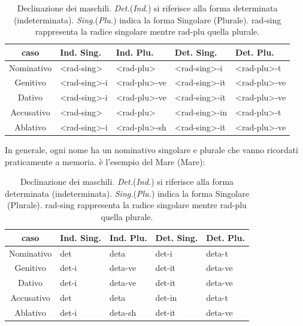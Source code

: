 \begin{table}[H]
    \centering
    \begin{tabular}{cllll}
        \toprule
        caso        & Ind. Sing.         & Ind. Plu.        & Det. Sing.      & Det. Plu. \\
        \midrule
        Nominativo  & <rad-sing>         & <rad-plu>        & <rad-sing>-i    & <rad-plu>-t  \\
        Genitivo    & <rad-sing>-i       & <rad-plu>-ve     & <rad-sing>-it   & <rad-plu>-ve \\
        Dativo      & <rad-sing>-i       & <rad-plu>-ve     & <rad-sing>-it   & <rad-plu>-ve \\
        Accusativo  & <rad-sing>         & <rad-plu>        & <rad-sing>-in   & <rad-plu>-t \\
        Ablativo    & <rad-sing>-i       & <rad-plu>-sh     & <rad-sing>-it   & <rad-plu>-ve \\
        \bottomrule
    \end{tabular}
    \caption{Declinazione dei maschili. \textit{Det.}(\textit{Ind.}) si riferisce alla forma determinata (indeterminata). \textit{Sing.}(\textit{Plu.}) indica la forma Singolare (Plurale). rad-sing rappresenta la radice singolare mentre rad-plu quella plurale\cite{shqipe-gramatike-01}.}
    \label{decl:1:generale}
\end{table}

In generale, ogni nome ha un nominativo singolare e plurale che vanno ricordati praticamente a memoria.  è l'esempio del Mare (\glsdesc{Mare}):

\begin{table}[H]
    \centering
    \begin{tabular}{cllll}
        \toprule
        caso        & Ind. Sing.         & Ind. Plu.        & Det. Sing.      & Det. Plu. \\
        \midrule
        Nominativo  & det         & deta        & det-i    & deta-t  \\
        Genitivo    & det-i       & deta-ve     & det-it   & deta-ve \\
        Dativo      & det-i       & deta-ve     & det-it   & deta-ve \\
        Accusativo  & det         & deta        & det-in   & deta-t \\
        Ablativo    & det-i       & deta-sh     & det-it   & deta-ve \\
        \bottomrule
    \end{tabular}
    \caption{Declinazione dei maschili. \textit{Det.}(\textit{Ind.}) si riferisce alla forma determinata (indeterminata). \textit{Sing.}(\textit{Plu.}) indica la forma Singolare (Plurale). rad-sing rappresenta la radice singolare mentre rad-plu quella plurale.}
    \label{decl:1:det}
\end{table}

